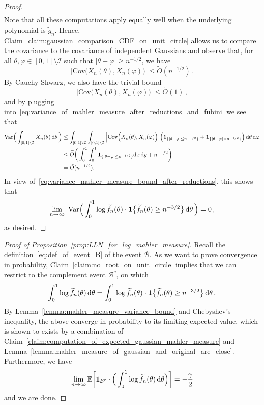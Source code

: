 \documentclass[11pt]{amsart}
\theoremstyle{remark}
\theoremstyle{definition}
\newcommand{\bE}{\mathbb E}
\newcommand{\one}{\boldsymbol{1}}
\begin{document}
\begin{proof}
\begin{align*}
        \end{align*}
        Note that all these computations apply equally well when the underlying polynomial is $\widetilde{g}_n$. Hence, Claim~\ref{claim:gaussian_comparison_CDF_on_unit_circle} allows us to compare the covariance to the covariance of independent Gaussians and observe that, for all $\theta,\varphi\in [0,1]\setminus \mathcal{I}$ such that $|\theta - \varphi|\ge n^{-1/2}$, we have
        \[
        \Big|\text{Cov}\Big(X_n(\theta) ,X_n(\varphi)\Big) \Big|\le \widetilde{O}(n^{-1/2}) \, .
        \]
        By Cauchy-Shwarz, we also have the trivial bound
        \[
        \Big|\text{Cov}\Big(X_n(\theta) ,X_n(\varphi)\Big) \Big|\le \widetilde{O}(1) 
        \, ,
        \]
        and by plugging into~\eqref{eq:variance_of_mahler_measure_after_reductions_and_fubini} we see that 
        \begin{align*}
            \text{Var}\Big(\int_{[0,1]\setminus \mathcal{I}} X_n(\theta) \, {\rm d}\theta \, \Big) & \leq \int_{[0,1]\setminus \mathcal{I}} \int_{[0,1]\setminus \mathcal{I}} \Big|\text{Cov}\Big(X_n(\theta) ,X_n(\varphi)\Big) \Big| \Big(\one_{\{|\theta-\varphi| \le n^{-1/2}\}} + \one_{\{|\theta-\varphi| > n^{-1/2}\}} \Big) \, {\rm d}\theta \, {\rm d}\varphi \\ &\le \widetilde{O} \bigg( \int_{0}^1\int_{0}^1  \one_{\{|\theta-\varphi| \le n^{-1/2}\}} {\rm d}x \, {\rm d}y  + n^{-1/2} \bigg) \\ &= \widetilde{O}(n^{-1/2}). 
        \end{align*}
        In view of~\eqref{eq:variance_mahler_measure_bound_after_reductions}, this shows that 
        \[
        \lim_{n\to \infty} \text{ Var}\Big( \int_{0}^1 \log \widetilde{f}_n(\theta) \cdot  \one\big\{ \widetilde f_n(\theta) \ge n^{-3/2}\big\} \, {\rm d}\theta \, \Big) = 0 \, ,
        \]
        as desired. 
    \end{proof}
    \begin{proof}[Proof of Proposition~\ref{prop:LLN_for_log_mahler_measure}]
        Recall the definition~\eqref{eq:def_of_event_B} of the event $\mathcal{B}$. As we want to prove convergence in probability, Claim~\ref{claim:no_root_on_unit_circle} implies that we can restrict to the complement event $\mathcal{B}^c$, on which 
        \[
        \int_{0}^1 \log \widetilde{f}_n(\theta) \, {\rm d}\theta  = \int_{0}^1 \log \widetilde{f}_n(\theta) \cdot  \one\big\{ \widetilde f_n(\theta) \ge n^{-3/2}\big\} \, {\rm d}\theta  \, .
        \]
        By Lemma~\ref{lemma:mahler_measure_variance_bound} and Chebyshev's inequality, the above converge in probability to its limiting expected value, which is shown to exists by a combination of Claim~\ref{claim:computation_of_expected_gaussian_mahler_measure} and Lemma~\ref{lemma:mahler_measure_of_gaussian_and_original_are_close}. Furthermore, we have 
        \[
        \lim_{n\to \infty} \bE\bigg[\one_{\mathcal{B}^c}\cdot \Big( \int_{0}^1 \log \widetilde{f}_n(\theta) \, {\rm d}\theta \Big)\bigg] = -\frac{\gamma}{2}
        \]
        and we are done. 
    \end{proof}
\end{document}
